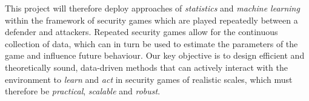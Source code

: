 


This project will therefore deploy approaches of {\em statistics} and {\em machine learning} within the framework of security games which are played repeatedly between a defender and attackers. Repeated security games allow for the continuous collection of data, which can in turn be used to estimate the parameters of the game and influence future behaviour. %
Our key objective is to design efficient and theoretically sound, data-driven methods that can actively interact with the environment to {\em learn} and {\em act} in security games of realistic scales, which must therefore be \textit{practical}, \textit{scalable} and \textit{robust}. 

